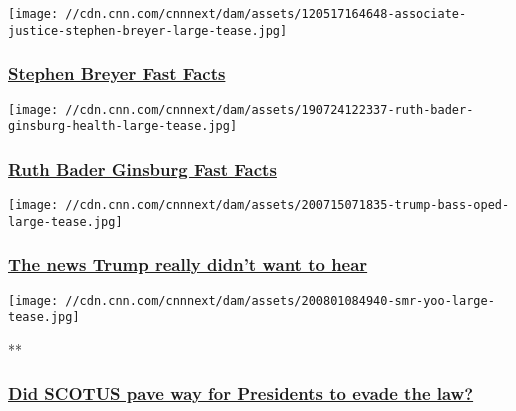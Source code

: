 \texttt{[image: //cdn.cnn.com/cnnnext/dam/assets/120517164648-associate-justice-stephen-breyer-large-tease.jpg]}

\hypertarget{stephen-breyer-fast-facts}{%
\subsubsection{\texorpdfstring{\href{/2013/02/19/us/stephen-breyer-fast-facts/index.html}{Stephen
Breyer Fast
Facts}}{Stephen Breyer Fast Facts}}\label{stephen-breyer-fast-facts}}

\href{/2013/03/07/us/ruth-bader-ginsburg-fast-facts/index.html}{}

\texttt{[image: //cdn.cnn.com/cnnnext/dam/assets/190724122337-ruth-bader-ginsburg-health-large-tease.jpg]}

\hypertarget{ruth-bader-ginsburg-fast-facts-}{%
\subsubsection{\texorpdfstring{\href{/2013/03/07/us/ruth-bader-ginsburg-fast-facts/index.html}{Ruth
Bader Ginsburg Fast Facts
}}{Ruth Bader Ginsburg Fast Facts }}\label{ruth-bader-ginsburg-fast-facts-}}

\href{/2020/08/03/opinions/manhattan-da-subpeona-bad-news-trump-honig/index.html}{}

\texttt{[image: //cdn.cnn.com/cnnnext/dam/assets/200715071835-trump-bass-oped-large-tease.jpg]}

\hypertarget{the-news-trump-really-didnt-want-to-hear}{%
\subsubsection{\texorpdfstring{\href{/2020/08/03/opinions/manhattan-da-subpeona-bad-news-trump-honig/index.html}{The
news Trump really didn't want to
hear}}{The news Trump really didn't want to hear}}\label{the-news-trump-really-didnt-want-to-hear}}

\href{/videos/tv/2020/07/25/did-scotus-pave-way-for-presidents-to-evade-the-law.cnn}{}

\texttt{[image: //cdn.cnn.com/cnnnext/dam/assets/200801084940-smr-yoo-large-tease.jpg]}

**

\hypertarget{did-scotus-pave-way-for-presidents-to-evade-the-law}{%
\subsubsection{\texorpdfstring{\href{/videos/tv/2020/07/25/did-scotus-pave-way-for-presidents-to-evade-the-law.cnn}{Did
SCOTUS pave way for Presidents to evade the
law?}}{Did SCOTUS pave way for Presidents to evade the law?}}\label{did-scotus-pave-way-for-presidents-to-evade-the-law}}

